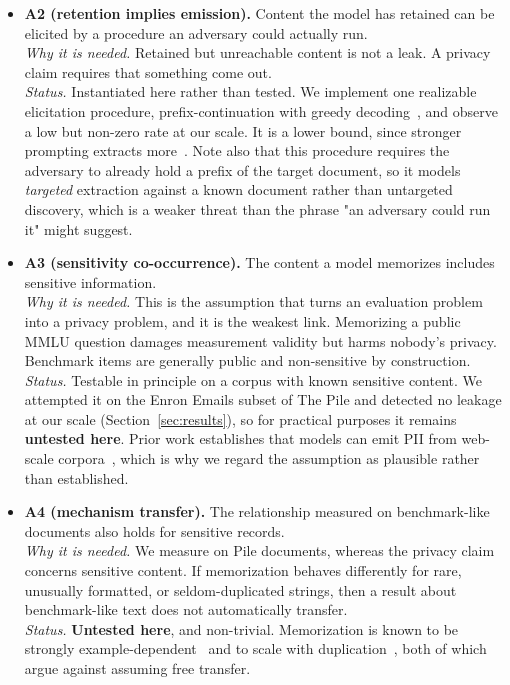 \begin{itemize}
 extraction is definitional, since both are computed from the same per-token
 probabilities. Read together, our evidence is consistent with A1 failing at this scale
 for every detector we test, including the baseline, and we regard establishing A1 for
 \emph{any} affordable detector as an open problem rather than a settled premise.
 \item \textbf{A2 (retention implies emission).} Content the model has retained can be
 elicited by a procedure an adversary could actually run. \\
 \emph{Why it is needed.} Retained but unreachable content is not a leak. A privacy claim
 requires that something come out. \\
 \emph{Status.} Instantiated here rather than tested. We implement one realizable
 elicitation procedure, prefix-continuation with greedy
 decoding~\citep{carlini2023quantifying}, and observe a low but non-zero rate at our
 scale. It is a lower bound, since stronger prompting extracts
 more~\citep{nasr2025scalable}. Note also that this procedure requires the adversary to
 already hold a prefix of the target document, so it models \emph{targeted} extraction
 against a known document rather than untargeted discovery, which is a weaker threat than
 the phrase "an adversary could run it" might suggest.
 \item \textbf{A3 (sensitivity co-occurrence).} The content a model memorizes includes
 sensitive information. \\
 \emph{Why it is needed.} This is the assumption that turns an evaluation problem into a
 privacy problem, and it is the weakest link. Memorizing a public MMLU question damages
 measurement validity but harms nobody's privacy. Benchmark items are generally public
 and non-sensitive by construction. \\
 \emph{Status.} Testable in principle on a corpus with known sensitive content. We
 attempted it on the Enron Emails subset of The Pile and detected no leakage at our
 scale (Section~\ref{sec:results}), so for practical purposes it remains
 \textbf{untested here}. Prior work establishes that models can emit PII from web-scale
 corpora~\citep{carlini2021extracting,lukas2023pii}, which is why we regard the
 assumption as plausible rather than established.
 \item \textbf{A4 (mechanism transfer).} The relationship measured on benchmark-like
 documents also holds for sensitive records. \\
 \emph{Why it is needed.} We measure on Pile documents, whereas the privacy claim
 concerns sensitive content. If memorization behaves differently for rare, unusually
 formatted, or seldom-duplicated strings, then a result about benchmark-like text does
 not automatically transfer. \\
 \emph{Status.} \textbf{Untested here}, and non-trivial. Memorization is known to be
 strongly example-dependent~\citep{zhang2023counterfactual} and to scale with
 duplication~\citep{carlini2023quantifying}, both of which argue against assuming free
 transfer.
\end{itemize}

